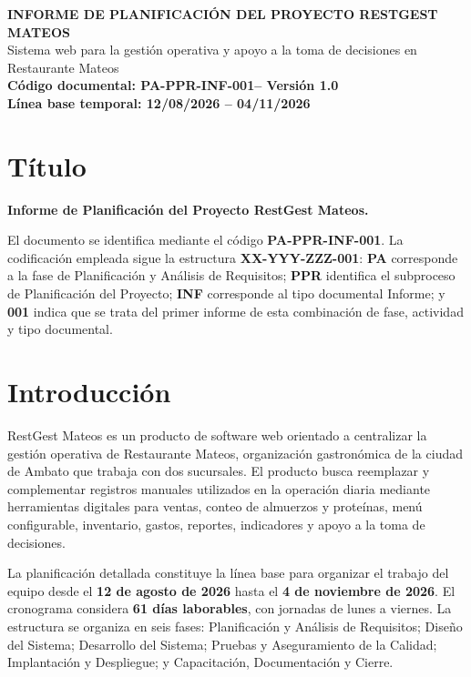 \documentclass[12pt,a4paper]{article}
\newcommand{\doccode}{PA-PPR-INF-001}
\begin{document}
\setcounter{page}{1}

\begin{center}
{\Large\bfseries INFORME DE PLANIFICACIÓN DEL PROYECTO RESTGEST MATEOS}\\[4pt]
{\large Sistema web para la gestión operativa y apoyo a la toma de decisiones en Restaurante Mateos}\\[6pt]
\textbf{Código documental: \doccode \quad -- \quad Versión 1.0}\\
\textbf{Línea base temporal: 12/08/2026 -- 04/11/2026}
\end{center}

\section{Título}

\textbf{Informe de Planificación del Proyecto RestGest Mateos.}

El documento se identifica mediante el código \textbf{\doccode}. La codificación empleada sigue la estructura
\textbf{XX-YYY-ZZZ-001}: \textbf{PA} corresponde a la fase de Planificación y Análisis de Requisitos; 
\textbf{PPR} identifica el subproceso de Planificación del Proyecto; \textbf{INF} corresponde al tipo documental 
Informe; y \textbf{001} indica que se trata del primer informe de esta combinación de fase, actividad y tipo documental.

\section{Introducción}

RestGest Mateos es un producto de software web orientado a centralizar la gestión operativa de Restaurante Mateos, 
organización gastronómica de la ciudad de Ambato que trabaja con dos sucursales. El producto busca reemplazar y 
complementar registros manuales utilizados en la operación diaria mediante herramientas digitales para ventas, 
conteo de almuerzos y proteínas, menú configurable, inventario, gastos, reportes, indicadores y apoyo a la toma de decisiones.

La planificación detallada constituye la línea base para organizar el trabajo del equipo desde el \textbf{12 de agosto de 2026} 
hasta el \textbf{4 de noviembre de 2026}. El cronograma considera \textbf{61 días laborables}, con jornadas de lunes a viernes. 
La estructura se organiza en seis fases: Planificación y Análisis de Requisitos; Diseño del Sistema; Desarrollo del Sistema; 
Pruebas y Aseguramiento de la Calidad; Implantación y Despliegue; y Capacitación, Documentación y Cierre.
\end{document}

